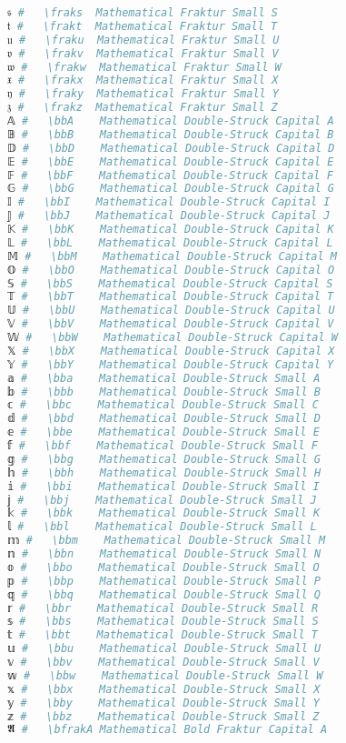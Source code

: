 \begin{lstlisting}[language=Julia, style=julia]
𝔰 #   \fraks  Mathematical Fraktur Small S
𝔱 #   \frakt  Mathematical Fraktur Small T
𝔲 #   \fraku  Mathematical Fraktur Small U
𝔳 #   \frakv  Mathematical Fraktur Small V
𝔴 #   \frakw  Mathematical Fraktur Small W
𝔵 #   \frakx  Mathematical Fraktur Small X
𝔶 #   \fraky  Mathematical Fraktur Small Y
𝔷 #   \frakz  Mathematical Fraktur Small Z
𝔸 #   \bbA    Mathematical Double-Struck Capital A
𝔹 #   \bbB    Mathematical Double-Struck Capital B
𝔻 #   \bbD    Mathematical Double-Struck Capital D
𝔼 #   \bbE    Mathematical Double-Struck Capital E
𝔽 #   \bbF    Mathematical Double-Struck Capital F
𝔾 #   \bbG    Mathematical Double-Struck Capital G
𝕀 #   \bbI    Mathematical Double-Struck Capital I
𝕁 #   \bbJ    Mathematical Double-Struck Capital J
𝕂 #   \bbK    Mathematical Double-Struck Capital K
𝕃 #   \bbL    Mathematical Double-Struck Capital L
𝕄 #   \bbM    Mathematical Double-Struck Capital M
𝕆 #   \bbO    Mathematical Double-Struck Capital O
𝕊 #   \bbS    Mathematical Double-Struck Capital S
𝕋 #   \bbT    Mathematical Double-Struck Capital T
𝕌 #   \bbU    Mathematical Double-Struck Capital U
𝕍 #   \bbV    Mathematical Double-Struck Capital V
𝕎 #   \bbW    Mathematical Double-Struck Capital W
𝕏 #   \bbX    Mathematical Double-Struck Capital X
𝕐 #   \bbY    Mathematical Double-Struck Capital Y
𝕒 #   \bba    Mathematical Double-Struck Small A
𝕓 #   \bbb    Mathematical Double-Struck Small B
𝕔 #   \bbc    Mathematical Double-Struck Small C
𝕕 #   \bbd    Mathematical Double-Struck Small D
𝕖 #   \bbe    Mathematical Double-Struck Small E
𝕗 #   \bbf    Mathematical Double-Struck Small F
𝕘 #   \bbg    Mathematical Double-Struck Small G
𝕙 #   \bbh    Mathematical Double-Struck Small H
𝕚 #   \bbi    Mathematical Double-Struck Small I
𝕛 #   \bbj    Mathematical Double-Struck Small J
𝕜 #   \bbk    Mathematical Double-Struck Small K
𝕝 #   \bbl    Mathematical Double-Struck Small L
𝕞 #   \bbm    Mathematical Double-Struck Small M
𝕟 #   \bbn    Mathematical Double-Struck Small N
𝕠 #   \bbo    Mathematical Double-Struck Small O
𝕡 #   \bbp    Mathematical Double-Struck Small P
𝕢 #   \bbq    Mathematical Double-Struck Small Q
𝕣 #   \bbr    Mathematical Double-Struck Small R
𝕤 #   \bbs    Mathematical Double-Struck Small S
𝕥 #   \bbt    Mathematical Double-Struck Small T
𝕦 #   \bbu    Mathematical Double-Struck Small U
𝕧 #   \bbv    Mathematical Double-Struck Small V
𝕨 #   \bbw    Mathematical Double-Struck Small W
𝕩 #   \bbx    Mathematical Double-Struck Small X
𝕪 #   \bby    Mathematical Double-Struck Small Y
𝕫 #   \bbz    Mathematical Double-Struck Small Z
𝕬 #   \bfrakA Mathematical Bold Fraktur Capital A

\end{lstlisting}

